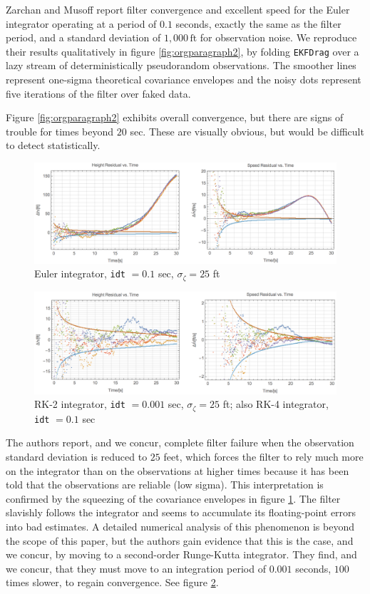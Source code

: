 \documentclass[10pt,oneside,x11names]{article}
\begin{document}
Zarchan and Musoff report filter convergence and excellent speed for the Euler
integrator operating at a period of \(0.1\) seconds, exactly the same as the
filter period, and a standard deviation of \(1,000\,\textrm{ft}\) for observation
noise. We reproduce their results qualitatively in figure
\ref{fig:orgparagraph2}, by folding \texttt{EKFDrag} over a lazy stream of
deterministically pseudorandom observations. The smoother lines represent
one-sigma theoretical covariance envelopes and the noisy dots represent five
iterations of the filter over faked data.

Figure \ref{fig:orgparagraph2} exhibits overall convergence, but there
are signs of trouble for times beyond \(20\) sec. These are visually obvious, but
would be difficult to detect statistically. 

\begin{figure}[htb]
\centering
\includegraphics[width=.9\linewidth]{euler-idt-point-1-zeta-25.png}
\caption{\label{fig:orgparagraph3}
Euler integrator, \texttt{idt} \(= 0.1\) sec, \(\sigma_\zeta = 25\) ft}
\end{figure}

\begin{figure}[htb]
\centering
\includegraphics[width=.9\linewidth]{rk2-idt-point-001-zeta-25.png}
\caption{\label{fig:orgparagraph4}
RK-2 integrator, \texttt{idt} \(= 0.001\) sec, \(\sigma_\zeta = 25\) ft; also RK-4 integrator, \texttt{idt} \(= 0.1\) sec}
\end{figure}

The authors report, and we concur, complete filter failure when the observation
standard deviation is reduced to \(25\) feet, which forces the filter to rely much
more on the integrator than on the observations at higher times because it has
been told that the observations are reliable (low sigma). This interpretation is
confirmed by the squeezing of the covariance envelopes in figure
\ref{fig:orgparagraph3}. The filter slavishly follows the integrator and
seems to accumulate its floating-point errors into bad estimates. A detailed
numerical analysis of this phenomenon is beyond the scope of this paper, but the
authors gain evidence that this is the case, and we concur, by moving to a
second-order Runge-Kutta integrator. They find, and we concur, that they must
move to an integration period of \(0.001\) seconds, \(100\) times slower, to regain
convergence. See figure \ref{fig:orgparagraph4}.
\end{document}
